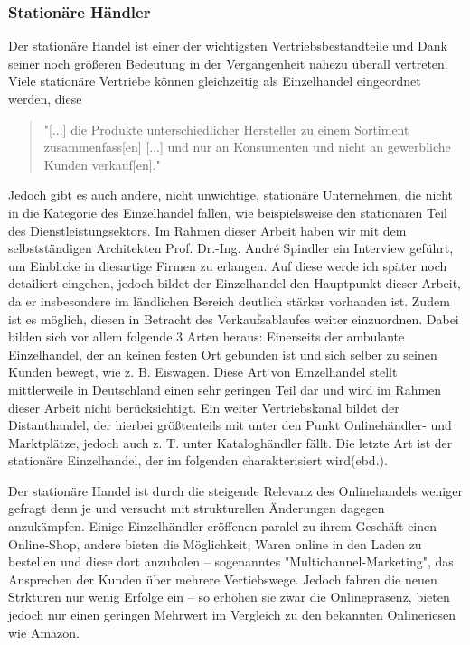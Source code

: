 \begin{folding} \subsubsection{Stationäre Händler}
Der stationäre Handel ist einer der wichtigsten Vertriebsbestandteile und Dank seiner noch größeren Bedeutung in der Vergangenheit nahezu überall vertreten. Viele stationäre Vertriebe können gleichzeitig als Einzelhandel eingeordnet werden, diese
\begin{quote}
    "[...] die Produkte unterschiedlicher Hersteller zu einem Sortiment zusammenfass[en] [...] und nur an Konsumenten und nicht an gewerbliche Kunden verkauf[en]."\cite[S. 20]{Ebert}
\end{quote}
Jedoch gibt es auch andere, nicht unwichtige, stationäre Unternehmen, die nicht in die Kategorie des Einzelhandel fallen, wie beispielsweise den stationären Teil des Dienstleistungsektors. Im Rahmen dieser Arbeit haben wir mit dem selbstständigen Architekten Prof. Dr.-Ing. André Spindler ein Interview geführt, um Einblicke in diesartige Firmen zu erlangen. Auf diese werde ich später noch detailiert eingehen, jedoch bildet der Einzelhandel den Hauptpunkt dieser Arbeit, da er insbesondere im ländlichen Bereich deutlich stärker vorhanden ist. Zudem ist es möglich, diesen in Betracht des Verkaufsablaufes weiter einzuordnen. Dabei bilden sich vor allem folgende 3 Arten heraus: Einerseits der ambulante Einzelhandel, der an keinen festen Ort gebunden ist und sich selber zu seinen Kunden bewegt, wie z. B. Eiswagen. Diese Art von Einzelhandel stellt mittlerweile in Deutschland einen sehr geringen Teil dar und wird im Rahmen dieser Arbeit nicht berücksichtigt. Ein weiter Vertriebskanal bildet der Distanthandel, der hierbei größtenteils mit unter den Punkt Onlinehändler- und Marktplätze, jedoch auch z. T. unter Kataloghändler fällt. Die letzte Art ist der stationäre Einzelhandel, der im folgenden charakterisiert wird(ebd.).

Der stationäre Handel ist durch die steigende Relevanz des Onlinehandels weniger gefragt denn je und versucht mit strukturellen Änderungen dagegen anzukämpfen. Einige Einzelhändler eröffenen paralel zu ihrem Geschäft einen Online-Shop, andere bieten die Möglichkeit, Waren online in den Laden zu bestellen und diese dort anzuholen – sogenanntes "Multichannel-Marketing", das Ansprechen der Kunden über mehrere Vertiebswege\cite[S. 34f]{Graf}. Jedoch fahren die neuen Strkturen nur wenig Erfolge ein – so erhöhen sie zwar die Onlinepräsenz, bieten jedoch nur einen geringen Mehrwert im Vergleich zu den bekannten Onlineriesen wie Amazon\cite[S. 34f]{Graf}. 


\end{folding}
